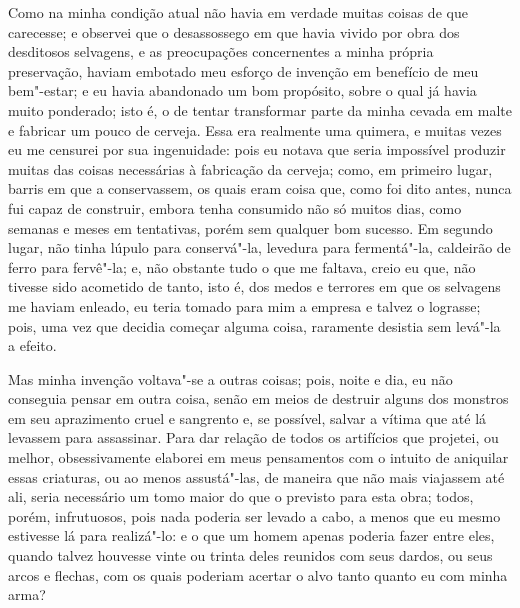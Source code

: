 Como na minha condição atual não havia em verdade muitas coisas de que
carecesse; e observei que o desassossego em que havia vivido por obra
dos desditosos selvagens, e as preocupações concernentes a minha própria
preservação, haviam embotado meu esforço de invenção em benefício de meu
bem"-estar; e eu havia abandonado um bom propósito, sobre o qual já havia
muito ponderado; isto é, o de tentar transformar parte da minha cevada
em malte e fabricar um pouco de cerveja. Essa era realmente uma quimera,
e muitas vezes eu me censurei por sua ingenuidade: pois eu notava que
seria impossível produzir muitas das coisas necessárias à fabricação da
cerveja; como, em primeiro lugar, barris em que a conservassem, os quais
eram coisa que, como foi dito antes, nunca fui capaz de construir,
embora tenha consumido não só muitos dias, como semanas e meses em
tentativas, porém sem qualquer bom sucesso. Em segundo lugar, não tinha
lúpulo para conservá"-la, levedura para fermentá"-la, caldeirão de ferro
para fervê"-la; e, não obstante tudo o que me faltava, creio eu que, não
tivesse sido acometido de tanto, isto é, dos medos e terrores em que os
selvagens me haviam enleado, eu teria tomado para mim a empresa e talvez
o lograsse; pois, uma vez que decidia começar alguma coisa, raramente
desistia sem levá"-la a efeito.

Mas minha invenção voltava"-se a outras coisas; pois, noite e dia, eu não
conseguia pensar em outra coisa, senão em meios de destruir alguns dos
monstros em seu aprazimento cruel e sangrento e, se possível, salvar a
vítima que até lá levassem para assassinar. Para dar relação de todos os
artifícios que projetei, ou melhor, obsessivamente elaborei em meus
pensamentos com o intuito de aniquilar essas criaturas, ou ao menos
assustá"-las, de maneira que não mais viajassem até ali, seria necessário
um tomo maior do que o previsto para esta obra; todos, porém,
infrutuosos, pois nada poderia ser levado a cabo, a menos que eu mesmo
estivesse lá para realizá"-lo: e o que um homem apenas poderia fazer
entre eles, quando talvez houvesse vinte ou trinta deles reunidos com
seus dardos, ou seus arcos e flechas, com os quais poderiam acertar o
alvo tanto quanto eu com minha arma?

